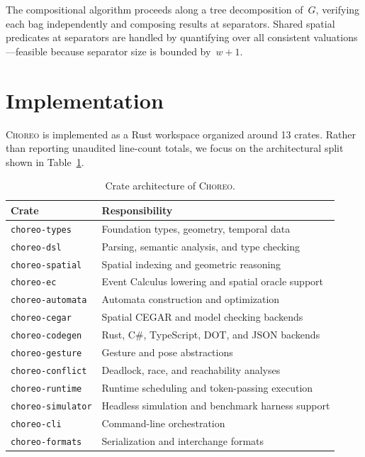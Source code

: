 \documentclass[11pt,a4paper]{article}
\begin{document}
The compositional algorithm proceeds along a tree decomposition of~$G$, verifying
each bag independently and composing results at separators.
Shared spatial predicates at separators are handled by quantifying over all
consistent valuations---feasible because separator size is bounded by~$w{+}1$.

\section{Implementation}\label{sec:implementation}

\textsc{Choreo} is implemented as a Rust workspace organized around 13
crates.  Rather than reporting unaudited line-count totals, we focus on
the architectural split shown in Table~\ref{tab:crates}.

\begin{table}[t]
\centering
\caption{Crate architecture of \textsc{Choreo}.}
\label{tab:crates}
\small
\begin{tabular}{@{}l l@{}}
\toprule
\textbf{Crate} & \textbf{Responsibility} \\
\midrule
\texttt{choreo-types}     & Foundation types, geometry, temporal data \\
\texttt{choreo-dsl}       & Parsing, semantic analysis, and type checking \\
\texttt{choreo-spatial}   & Spatial indexing and geometric reasoning \\
\texttt{choreo-ec}        & Event Calculus lowering and spatial oracle support \\
\texttt{choreo-automata}  & Automata construction and optimization \\
\texttt{choreo-cegar}     & Spatial CEGAR and model checking backends \\
\texttt{choreo-codegen}   & Rust, C\#, TypeScript, DOT, and JSON backends \\
\texttt{choreo-gesture}   & Gesture and pose abstractions \\
\texttt{choreo-conflict}  & Deadlock, race, and reachability analyses \\
\texttt{choreo-runtime}   & Runtime scheduling and token-passing execution \\
\texttt{choreo-simulator} & Headless simulation and benchmark harness support \\
\texttt{choreo-cli}       & Command-line orchestration \\
\texttt{choreo-formats}   & Serialization and interchange formats \\
\bottomrule
\end{tabular}
\end{table}
\end{document}
